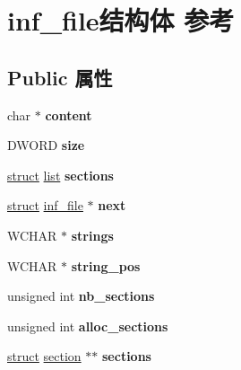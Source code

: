 \hypertarget{structinf__file}{}\section{inf\+\_\+file结构体 参考}
\label{structinf__file}
\subsection*{Public 属性}
\begin{DoxyCompactItemize}
\item 
\mbox{\label{structinf__file_aa3f1804cb6959b49a42bbd26dd1dc58e}} 
char $\ast$ {\bfseries content}
\item 
\mbox{\label{structinf__file_a93672c475ad8e813fb81c24c084c4d1f}} 
D\+W\+O\+RD {\bfseries size}
\item 
\mbox{\label{structinf__file_a480d5fde6ecb0f392ec2f8cf00702d11}} 
\hyperlink{interfacestruct}{struct} \hyperlink{classlist}{list} {\bfseries sections}
\item 
\mbox{\label{structinf__file_a052832eb291b9c370f88f5a9ced85c0a}} 
\hyperlink{interfacestruct}{struct} \hyperlink{structinf__file}{inf\+\_\+file} $\ast$ {\bfseries next}
\item 
\mbox{\label{structinf__file_ad19e83e292e1d471cf2b2f0f66dc936d}} 
W\+C\+H\+AR $\ast$ {\bfseries strings}
\item 
\mbox{\label{structinf__file_a7df69101b1c35f79537eaaf29f4e990d}} 
W\+C\+H\+AR $\ast$ {\bfseries string\+\_\+pos}
\item 
\mbox{\label{structinf__file_a263735e2b8a1f1b0e5fafee855e870cd}} 
unsigned int {\bfseries nb\+\_\+sections}
\item 
\mbox{\label{structinf__file_a3c03f6a273eb18c2ddb9a902e33ec7a0}} 
unsigned int {\bfseries alloc\+\_\+sections}
\item 
\mbox{\label{structinf__file_a9ed5199ca0b09764b230460045684f72}} 
\hyperlink{interfacestruct}{struct} \hyperlink{structsection}{section} $\ast$$\ast$ {\bfseries sections}
$$
\end{DoxyCompactItemize}

